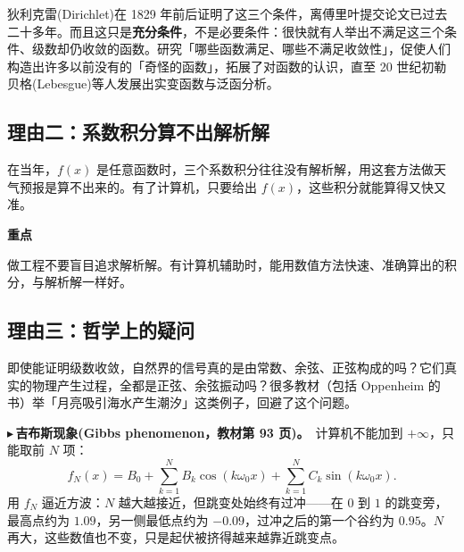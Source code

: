\documentclass[UTF8,a4paper,11pt]{ctexart}
\newenvironment{remember}{\begin{rememberbox}\textbf{重点}\par\smallskip}{\end{rememberbox}}
\newcounter{ex}[section]
\newcommand{\point}[1]{\par\addvspace{1ex}\noindent\textcolor{ptteal}{$\blacktriangleright$\,\textbf{#1}}\ }
\begin{document}
狄利克雷(Dirichlet)在 1829 年前后证明了这三个条件，离傅里叶提交论文已过去二十多年。而且这只是\textbf{充分条件}，不是必要条件：很快就有人举出不满足这三个条件、级数却仍收敛的函数。研究「哪些函数满足、哪些不满足收敛性」，促使人们构造出许多以前没有的「奇怪的函数」，拓展了对函数的认识，直至 20 世纪初勒贝格(Lebesgue)等人发展出实变函数与泛函分析。

\subsection{理由二：系数积分算不出解析解}
在当年，$f(x)$ 是任意函数时，三个系数积分往往没有解析解，用这套方法做天气预报是算不出来的。有了计算机，只要给出 $f(x)$，这些积分就能算得又快又准。

\begin{remember}
做工程不要盲目追求解析解。有计算机辅助时，能用数值方法快速、准确算出的积分，与解析解一样好。
\end{remember}

\subsection{理由三：哲学上的疑问}
即使能证明级数收敛，自然界的信号真的是由常数、余弦、正弦构成的吗？它们真实的物理产生过程，全都是正弦、余弦振动吗？很多教材（包括 Oppenheim 的书）举「月亮吸引海水产生潮汐」这类例子，回避了这个问题。

\point{吉布斯现象(Gibbs phenomenon，教材第 93 页)。}计算机不能加到 $+\infty$，只能取前 $N$ 项：
\[
f_N(x)=B_0+\sum_{k=1}^{N}B_k\cos(k\omega_0x)+\sum_{k=1}^{N}C_k\sin(k\omega_0x).
\]
用 $f_N$ 逼近方波：$N$ 越大越接近，但跳变处始终有过冲——在 $0$ 到 $1$ 的跳变旁，最高点约为 $1.09$，另一侧最低点约为 $-0.09$，过冲之后的第一个谷约为 $0.95$。$N$ 再大，这些数值也不变，只是起伏被挤得越来越靠近跳变点。
\end{document}
